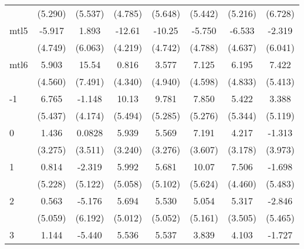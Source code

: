\documentclass{article}
\begin{document}
{\begin{longtable}{l*{7}{c}}
                &  (5.290)         &  (5.537)         &  (4.785)         &  (5.648)         &  (5.442)         &  (5.216)         &  (6.728)         \\
mtl5            &   -5.917         &    1.893         &   -12.61\sym{**} &   -10.25\sym{*}  &   -5.750         &   -6.533         &   -2.319         \\
                &  (4.749)         &  (6.063)         &  (4.219)         &  (4.742)         &  (4.788)         &  (4.637)         &  (6.041)         \\
mtl6            &    5.903         &    15.54\sym{*}  &    0.816         &    3.577         &    7.125         &    6.195         &    7.422         \\
                &  (4.560)         &  (7.491)         &  (4.340)         &  (4.940)         &  (4.598)         &  (4.833)         &  (5.413)         \\
-1              &    6.765         &   -1.148         &    10.13         &    9.781         &    7.850         &    5.422         &    3.388         \\
                &  (5.437)         &  (4.174)         &  (5.494)         &  (5.285)         &  (5.276)         &  (5.344)         &  (5.119)         \\
0               &    1.436         &   0.0828         &    5.939         &    5.569         &    7.191         &    4.217         &   -1.313         \\
                &  (3.275)         &  (3.511)         &  (3.240)         &  (3.276)         &  (3.607)         &  (3.178)         &  (3.973)         \\
1               &    0.814         &   -2.319         &    5.992         &    5.681         &    10.07         &    7.506         &   -1.698         \\
                &  (5.228)         &  (5.122)         &  (5.058)         &  (5.102)         &  (5.624)         &  (4.460)         &  (5.483)         \\
2               &    0.563         &   -5.176         &    5.694         &    5.530         &    5.054         &    5.317         &   -2.846         \\
                &  (5.059)         &  (6.192)         &  (5.012)         &  (5.052)         &  (5.161)         &  (3.505)         &  (5.465)         \\
3               &    1.144         &   -5.440         &    5.536         &    5.537         &    3.839         &    4.103         &   -1.727         \\

\end{longtable}}
\end{document}
